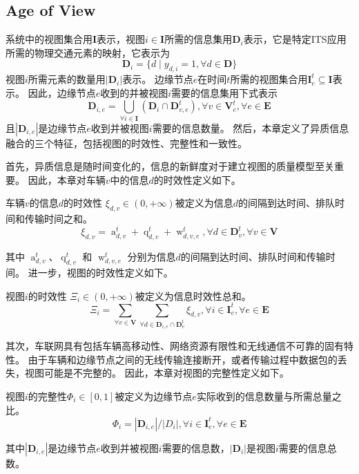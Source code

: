 \subsection{Age of View}
系统中的视图集合用$\mathbf{I}$表示，视图$i \in \mathbf{I}$所需的信息集用$\mathbf{D}_{i}$表示，它是特定ITS应用所需的物理交通元素的映射，它表示为
\begin{equation}
	\mathbf{D}_{i} = \{d \mid y_{d, i} = 1, \forall d \in \mathbf{D} \}
\end{equation}
视图$i$所需元素的数量用$|\mathbf{D}_{i}|$表示。
边缘节点$e$在时间$t$所需的视图集合用$\mathbf{I}_e^t \subseteq \mathbf{I}$表示。
因此，边缘节点$e$收到的并被视图$i$需要的信息集用下式表示
\begin{equation}
    \mathbf{D}_{i, e}=\bigcup_{\forall i \in \mathbf{I}}\left(\mathbf{D}_i \cap \mathbf{D}_{v, e}^t\right), \forall v \in \mathbf{V}_e^t, \forall e \in \mathbf{E}
\end{equation}
且$| \mathbf{D}_{i, e} |$是边缘节点$e$收到并被视图$i$需要的信息数量。
然后，本章定义了异质信息融合的三个特征，包括视图的时效性、完整性和一致性。

首先，异质信息是随时间变化的，信息的新鲜度对于建立视图的质量模型至关重要。
因此，本章对车辆$v$中的信息$d$的时效性定义如下。
\begin{definition}
	车辆$v$的信息$d$的时效性 $\xi_{d,v} \in (0, +\infty)$被定义为信息$d$的间隔到达时间、排队时间和传输时间之和。
	\begin{equation}
    	\xi_{d, v} = \operatorname{a}_{d, v}^t + \operatorname{q}_{d, v}^t + \operatorname{w}_{d, v, e}^t, \forall d \in \mathbf{D}_v^t, \forall v \in \mathbf{V}
	\end{equation}
\end{definition}
\noindent 其中 $\operatorname{a}_{d, v}^t$、$\operatorname{q}_{d, v}^t$ 和 $\operatorname{w}_{d, v, e}^t$ 分别为信息$d$的间隔到达时间、排队时间和传输时间。
进一步，视图的时效性定义如下。
\begin{definition}
视图$i$的时效性 $\Xi_{i} \in (0,+\infty)$被定义为信息时效性总和。
	\begin{equation}
    	\Xi_{i} = \sum_{\forall v \in \mathbf{V}} \sum_{\forall d \in \mathbf{D}_{i, e} \cap \mathbf{D}_v^t } \xi_{d, v}, \forall i \in \mathbf{I}_e^t, \forall e \in \mathbf{E}
	\end{equation}
\end{definition}

其次，车联网具有包括车辆高移动性、网络资源有限性和无线通信不可靠的固有特性。
由于车辆和边缘节点之间的无线传输连接断开，或者传输过程中数据包的丢失，视图可能是不完整的。
因此，本章对视图的完整性定义如下。
\begin{definition}
	视图$i$的完整性$\Phi_{i} \in [0,1]$被定义为边缘节点$e$实际收到的信息数量与所需总量之比。
	\begin{equation}
	\Phi_{i}= {| \mathbf{D}_{i, e} |} \big/ {|D_{i} |}, \forall i \in \mathbf{I}_e^t, \forall e \in \mathbf{E}
	\end{equation}
\end{definition}
\noindent 其中$|\mathbf{D}_{i, e}|$是边缘节点$e$收到并被视图$i$需要的信息数，$|\mathbf{D}_{i}|$是视图$i$需要的信息总数。

